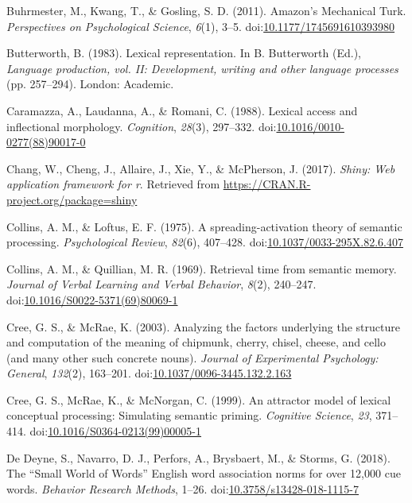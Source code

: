 \documentclass[english,,man]{apa6}
\begin{document}
\leavevmode\hypertarget{ref-Buhrmester2011}{}%
Buhrmester, M., Kwang, T., \& Gosling, S. D. (2011). Amazon's Mechanical Turk. \emph{Perspectives on Psychological Science}, \emph{6}(1), 3--5. doi:\href{https://doi.org/10.1177/1745691610393980}{10.1177/1745691610393980}

\leavevmode\hypertarget{ref-Butterworth1983}{}%
Butterworth, B. (1983). Lexical representation. In B. Butterworth (Ed.), \emph{Language production, vol. II: Development, writing and other language processes} (pp. 257--294). London: Academic.

\leavevmode\hypertarget{ref-Caramazza1988}{}%
Caramazza, A., Laudanna, A., \& Romani, C. (1988). Lexical access and inflectional morphology. \emph{Cognition}, \emph{28}(3), 297--332. doi:\href{https://doi.org/10.1016/0010-0277(88)90017-0}{10.1016/0010-0277(88)90017-0}

\leavevmode\hypertarget{ref-R-shiny}{}%
Chang, W., Cheng, J., Allaire, J., Xie, Y., \& McPherson, J. (2017). \emph{Shiny: Web application framework for r}. Retrieved from \url{https://CRAN.R-project.org/package=shiny}

\leavevmode\hypertarget{ref-Collins1975}{}%
Collins, A. M., \& Loftus, E. F. (1975). A spreading-activation theory of semantic processing. \emph{Psychological Review}, \emph{82}(6), 407--428. doi:\href{https://doi.org/10.1037/0033-295X.82.6.407}{10.1037/0033-295X.82.6.407}

\leavevmode\hypertarget{ref-Collins1969}{}%
Collins, A. M., \& Quillian, M. R. (1969). Retrieval time from semantic memory. \emph{Journal of Verbal Learning and Verbal Behavior}, \emph{8}(2), 240--247. doi:\href{https://doi.org/10.1016/S0022-5371(69)80069-1}{10.1016/S0022-5371(69)80069-1}

\leavevmode\hypertarget{ref-Cree2003}{}%
Cree, G. S., \& McRae, K. (2003). Analyzing the factors underlying the structure and computation of the meaning of chipmunk, cherry, chisel, cheese, and cello (and many other such concrete nouns). \emph{Journal of Experimental Psychology: General}, \emph{132}(2), 163--201. doi:\href{https://doi.org/10.1037/0096-3445.132.2.163}{10.1037/0096-3445.132.2.163}

\leavevmode\hypertarget{ref-Cree1999}{}%
Cree, G. S., McRae, K., \& McNorgan, C. (1999). An attractor model of lexical conceptual processing: Simulating semantic priming. \emph{Cognitive Science}, \emph{23}, 371--414. doi:\href{https://doi.org/10.1016/S0364-0213(99)00005-1}{10.1016/S0364-0213(99)00005-1}

\leavevmode\hypertarget{ref-DeDeyne2018a}{}%
De Deyne, S., Navarro, D. J., Perfors, A., Brysbaert, M., \& Storms, G. (2018). The ``Small World of Words'' English word association norms for over 12,000 cue words. \emph{Behavior Research Methods}, 1--26. doi:\href{https://doi.org/10.3758/s13428-018-1115-7}{10.3758/s13428-018-1115-7}
\end{document}
